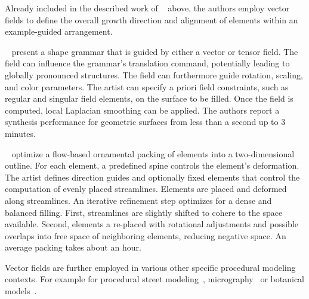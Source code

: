 Already included in the described work of \citeauthor*{ijiri_2008_aeb}~\cite{ijiri_2008_aeb} above, the authors employ vector fields to define the overall growth direction and alignment of elements within an example-guided arrangement.

\citeauthor*{yuanyuan_2011_gso}~\cite{yuanyuan_2011_gso} present a shape grammar that is guided by either a vector or tensor field. The field can influence the grammar’s translation command, potentially leading to globally pronounced structures. The field can furthermore guide rotation, scaling, and color parameters. The artist can specify a priori field constraints, such as regular and singular field elements, on the surface to be filled. Once the field is computed, local Laplacian smoothing can be applied. The authors report a synthesis performance for geometric surfaces from less than a second up to 3 minutes.

\citeauthor*{saputra_2017_ffo}~\cite{saputra_2017_ffo} optimize a flow-based ornamental packing of elements into a two-dimensional outline. For each element, a predefined spine controls the element’s deformation. The artist defines direction guides and optionally fixed elements that control the computation of evenly placed streamlines. Elements are placed and deformed along streamlines. An iterative refinement step optimizes for a dense and balanced filling. First, streamlines are slightly shifted to cohere to the space available. Second, elements a re-placed with rotational adjustments and possible overlaps into free space of neighboring elements, reducing negative space. An average packing takes about an hour.

Vector fields are further employed in various other specific procedural modeling contexts. For example for procedural street modeling~\cite{chen_2008_ips}, micrography~\cite{maharik_2011_dm} or botanical models~\cite{xu_2015_ptm}.



 
